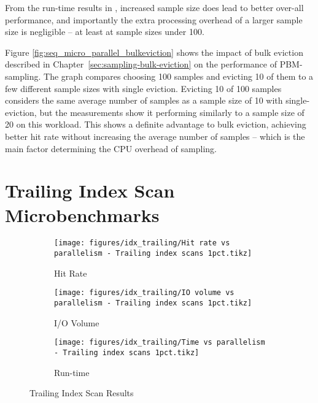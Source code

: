 From the run-time results in , increased sample size does lead to better over-all performance, and importantly the extra processing overhead of a larger sample size is negligible -- at least at sample sizes under 100.

Figure \ref{fig:seq_micro_parallel_bulkeviction} shows the impact of bulk eviction described in Chapter~\ref{sec:sampling-bulk-eviction} on the performance of PBM-sampling. The graph compares choosing 100 samples and evicting 10 of them to a few different sample sizes with single eviction. Evicting 10 of 100 samples considers the same average number of samples as a sample size of 10 with single-eviction, but the measurements show it performing similarly to a sample size of 20 on this workload. This shows a definite advantage to bulk eviction, achieving better hit rate without increasing the average number of samples -- which is the main factor determining the CPU overhead of sampling.



\section{Trailing Index Scan Microbenchmarks}

\begin{figure}
\centering
    \begin{subfigure}{0.45\textwidth}
        \centering
        \texttt{[image: figures/idx\_trailing/Hit rate vs parallelism - Trailing index scans 1pct.tikz]}
        \caption{Hit Rate}
        \label{fig:idx_trailing_hitrate}
    \end{subfigure}\hspace{0.05\textwidth}%
    \begin{subfigure}{0.45\textwidth}
        \centering
        \texttt{[image: figures/idx\_trailing/IO volume vs parallelism - Trailing index scans 1pct.tikz]}
        \caption{I/O Volume}
        \label{fig:idx_trailing_iovol}
    \end{subfigure}
    
\vspace{20pt}
    \begin{subfigure}{0.45\textwidth}
        \centering
        \texttt{[image: figures/idx\_trailing/Time vs parallelism - Trailing index scans 1pct.tikz]}
        \caption{Run-time}
        \label{fig:idx_trailing_runtime}
    \end{subfigure}
    \caption{Trailing Index Scan Results}
    \label{fig:idx_trailing}
\end{figure}


